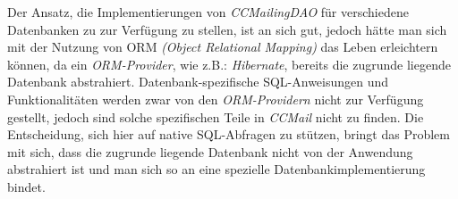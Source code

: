 \newline
\newline
Der Ansatz, die Implementierungen von \emph{CCMailingDAO} für verschiedene Datenbanken zu zur Verfügung zu stellen, ist an sich gut, jedoch hätte man sich mit der Nutzung von ORM \emph{(Object Relational Mapping)} das Leben erleichtern können, da ein \emph{ORM-Provider}, wie z.B.: \emph{Hibernate}, bereits die zugrunde liegende Datenbank abstrahiert. Datenbank-spezifische SQL-Anweisungen und Funktionalitäten werden zwar von den \emph{ORM-Providern} nicht zur Verfügung gestellt, jedoch sind solche spezifischen Teile in \emph{CCMail} nicht zu finden. Die Entscheidung, sich hier auf native SQL-Abfragen zu stützen, bringt das Problem mit sich, dass die zugrunde liegende Datenbank nicht von der Anwendung abstrahiert ist und man sich so an eine spezielle Datenbankimplementierung bindet.


